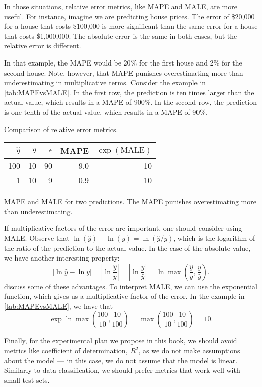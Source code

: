 In those situations, relative error metrics, like MAPE and MALE, are more useful.  For
instance, imagine we are predicting house prices.  The error of \$20,000
for a house that costs \$100,000 is more significant than the same error for a house that
costs \$1,000,000.  The absolute error is the same in both cases, but the relative error
is different.

In that example, the MAPE would be 20\% for the first house and 2\% for the second house.
Note, however, that MAPE punishes overestimating more than underestimating in
multiplicative terms.  Consider the example in \cref{tab:MAPEvsMALE}.  In the first row,
the prediction is ten times larger than the actual value, which results in a MAPE of
900\%.  In the second row, the prediction is one tenth of the actual value, which results
in a MAPE of 90\%.

\begin{tablebox}[label=tab:MAPEvsMALE]{Comparison of relative error metrics.}
  \centering
  \begin{tabular}{r r r r r}
    \toprule
    $\hat{y}$ & $y$ & $\epsilon$ & MAPE & $\exp(\text{MALE})$ \\
    \midrule
    100 & 10 & 90 & 9.0 & 10 \\
      1 & 10 &  9 & 0.9 & 10 \\
    \bottomrule
  \end{tabular}
  \tcblower
  MAPE and MALE for two predictions.  The MAPE punishes overestimating more than
  underestimating.
\end{tablebox}

If multiplicative factors of the error are important, one should consider using MALE.
Observe that $\ln(\hat{y}) - \ln(y) = \ln(\hat{y}/y)$, which is the logarithm of the
ratio of the prediction to the actual value.  In the case of the absolute value, we have
another interesting property: \[
  |\ln\hat{y} - \ln y| =
    |\ln\frac{\hat{y}}{y}| =
    |\ln\frac{y}{\hat{y}}| =
    \ln\max\left(\frac{\hat{y}}{y}, \frac{y}{\hat{y}}\right)\text{.}
\]
\textcite{Tofallis2015} discuss some of these advantages.  To
interpret MALE, we can use the exponential function, which gives us a multiplicative
factor of the error.  In the example in \cref{tab:MAPEvsMALE}, we have that \[
  \exp\ln\max\left(\frac{100}{10}, \frac{10}{100}\right) =
    \max\left(\frac{100}{10}, \frac{10}{100}\right) = 10\text{.}
\]

Finally, for the experimental plan we propose in this book, we should avoid metrics like
coefficient of determination, $R^2$, as we do not make assumptions about the model --- in this
case, we do not assume that the model is linear.  Similarly to data classification, we
should prefer metrics that work well with small test sets.


